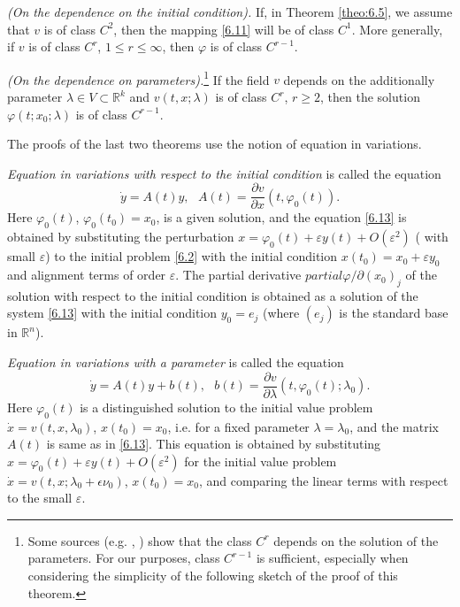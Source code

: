 \begin{theorem}\label{theo:6.7}
	\emph{(On the dependence on the initial condition).}
	If, in Theorem \ref{theo:6.5}, we assume that $v$ is of class $C^2$, then the mapping \eqref{6.11} will be of class $C^1$. More generally, if $v$ is of class $C^r$, $1 \leq r \leq \infty$, then $\varphi $ is of class $C^{r-1}$.
\end{theorem}

\begin{theorem}\label{theo:6.8}
	\emph{(On the dependence on parameters).}\footnote{Some sources (e.g. \cite{Hart}, \cite{Hale}) show that the class $C^r$ depends on the solution of the parameters. For our purposes, class $C^{r-1}$ is sufficient, especially when considering the simplicity of the following sketch of the proof of this theorem.}
	If the field $v$ depends on the additionally parameter $\lambda \in V\subset \mathbb{R}^{k}$ and $v(t,x;\lambda )$ is of class $C^r$, $r \geq 2$, then the solution $\varphi (t;x_{0};\lambda )$ is of class $C^{r-1}$.
\end{theorem}

The proofs of the last two theorems use the notion of equation in variations.

\emph{Equation in variations with respect to the initial condition} is called the equation
\begin{equation}
\label{6.13}
\dot{y}=A(t)y,\text{ \ \ }A(t)=\frac{\partial v}{\partial x}(t,\varphi
_{0}(t)).
\end{equation}
Here $\varphi _{0}(t)$, $\varphi _{0}(t_{0})=x_{0}$, is a given solution, and the equation \eqref{6.13} is obtained by substituting the perturbation $x= \varphi_{0} (t) + \varepsilon y(t) + O(\varepsilon ^{2})$ ( with small $\varepsilon$) to the initial problem \eqref{6.2} with the initial condition $x(t_{0})=x_{0}+\varepsilon y_{0}$ and alignment terms of order $\varepsilon$.	 The partial derivative $partial \varphi /\partial (x_{0})_{j}$ of the solution with respect to the initial condition is obtained as a solution of the system \eqref{6.13} with the initial condition $y_{0}=e_{j}$ (where $(e_{j})$ is the standard base in $\mathbb{R}^{n}$).

\emph{Equation in variations with a parameter} is called the equation
\begin{equation}
\label{6.14}
\dot{y}=A(t)y+b(t),\text{ \ \ }b(t)=\frac{\partial v}{\partial \lambda }%
(t,\varphi _{0}(t);\lambda _{0}).
\end{equation}
Here $\varphi _{0}(t)$ is a distinguished solution to the initial value problem $\dot{x}=v(t,x,\lambda _{0})$, $x(t_{0}) = x_{0}$, i.e. for a fixed parameter $\lambda =\lambda _{0}$, and the matrix $A(t)$ is same as in \eqref{6.13}. This equation is obtained by substituting $x=\varphi _{0}(t)+\varepsilon y(t)+O(\varepsilon ^{2})$ for the initial value problem $\dot{x}=v(t,x;\lambda _{0}+\epsilon \nu _{0})$, $x(t_{0})=x_{0}$, and comparing the linear terms with respect to the small $\varepsilon$.

